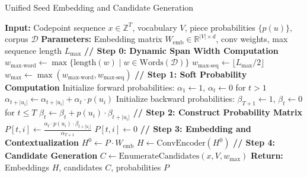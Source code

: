 \begin{algorithm}[H]
	\caption{Unified Seed Embedding and Candidate Generation}
	\label{alg:seed-embedding-pipeline}
	\begin{algorithmic}[1]
		\STATE \textbf{Input:} Codepoint sequence \(x \in \mathbb{Z}^T\), vocabulary \(V\), 
		\STATE \qquad piece probabilities \(\{p(u)\}\), corpus \(\mathcal{D}\)
		\STATE \textbf{Parameters:} Embedding matrix \(W_{\mathrm{emb}} \in \mathbb{R}^{|V| \times d}\), 
		\STATE \qquad conv weights, max sequence length \(L_{\max}\)
		\STATE
		\STATE \textbf{// Step 0: Dynamic Span Width Computation}
		\STATE \(w_{\text{max-word}} \leftarrow \max\{\text{length}(w) \mid w \in \text{Words}(\mathcal{D})\}\)
		\STATE \(w_{\text{max-seq}} \leftarrow \lfloor L_{\max} / 2 \rfloor\)
		\STATE \(w_{\max} \leftarrow \max(w_{\text{max-word}}, w_{\text{max-seq}})\)
		\STATE
		\STATE \textbf{// Step 1: Soft Probability Computation}
		\STATE Initialize forward probabilities: \(\alpha_1 \leftarrow 1\), 
		\STATE \qquad \(\alpha_t \leftarrow 0\) for \(t > 1\)
		\STATE \(\alpha_{t + |u_i|} \leftarrow \alpha_{t + |u_i|} + \alpha_t \cdot p(u_i)\)
		\ENDFOR
		\ENDFOR
		\STATE
		\STATE Initialize backward probabilities: \(\beta_{T+1} \leftarrow 1\), 
		\STATE \qquad \(\beta_t \leftarrow 0\) for \(t \leq T\)
		\STATE \(\beta_t \leftarrow \beta_t + p(u_i) \cdot \beta_{t + |u_i|}\)
		\ENDFOR
		\ENDFOR
		\STATE
		\STATE \textbf{// Step 2: Construct Probability Matrix}
		\STATE \(P[t, i] \leftarrow \frac{\alpha_t \cdot p(u_i) \cdot \beta_{t + |u_i|}}{\alpha_{T+1}}\)
		\ELSE
		\STATE \(P[t, i] \leftarrow 0\)
		\ENDIF
		\ENDFOR
		\ENDFOR
		\STATE
		\STATE \textbf{// Step 3: Embedding and Contextualization}
		\STATE \(H^0 \leftarrow P \cdot W_{\mathrm{emb}}\) 
		\STATE \(H \leftarrow \text{ConvEncoder}(H^0)\) 
		\STATE
		\STATE \textbf{// Step 4: Candidate Generation}
		\STATE \(C \leftarrow \text{EnumerateCandidates}(x, V, w_{\max})\) 
		\STATE \qquad {}
		\STATE
		\STATE \textbf{Return:} Embeddings \(H\), candidates \(C\), probabilities \(P\)
	\end{algorithmic}
\end{algorithm}

